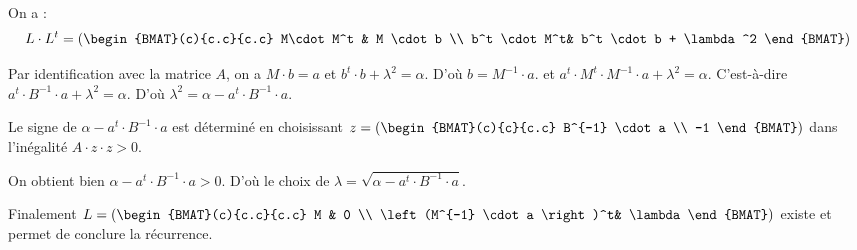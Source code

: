 \documentclass{beamer}
\begin{document}
\begin{frame}



On a :
\[
L \cdot L^t= \left( \begin{BMAT}(c){c.c}{c.c}
M\cdot M^t & M \cdot b \\
b^t \cdot M^t& b^t \cdot b + \lambda^2 
\end{BMAT} \right)
\]

Par identification avec la matrice $A$, on a $M \cdot b=a$ et $b^t \cdot b +\lambda^2=\alpha$. D'où $b=M^{-1} \cdot a$.
et $a^t \cdot M^t \cdot M^{-1} \cdot a + \lambda^2=\alpha$. C'est-à-dire $a^t\cdot B^{-1} \cdot a + \lambda^2=\alpha$. D'où $\lambda^2=\alpha-a^t \cdot B^{-1} \cdot a$.

Le signe de $\alpha- a^t \cdot B^{-1} \cdot a$ est déterminé en choisissant 
$z=
\left( \begin{BMAT}(c){c}{c.c}
B^{-1} \cdot a \\
-1
\end{BMAT}\right)$
dans l'inégalité $A \cdot z \cdot z >0$.



On obtient bien $\alpha-a^t \cdot B^{-1} \cdot a >0$. D'où le choix de $\lambda=\sqrt{\alpha-a^t\cdot B^{-1} \cdot a}$.

Finalement $
L = \left( \begin{BMAT}(c){c.c}{c.c}
M  & 0 \\
 \left(M^{-1} \cdot a \right)^t&  \lambda
\end{BMAT} \right)
$
existe et permet de conclure la récurrence.


\end{frame}
\end{document}
